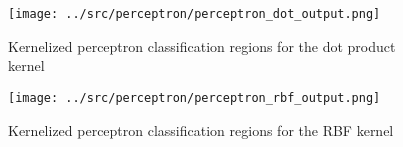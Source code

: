 \begin{answer}
\begin{figure}[h]
    \centering
    \texttt{[image: ../src/perceptron/perceptron\_dot\_output.png]}
    \caption{Kernelized perceptron classification regions for the dot product kernel}
\end{figure}

\begin{figure}[h]
    \centering
    \texttt{[image: ../src/perceptron/perceptron\_rbf\_output.png]}
    \caption{Kernelized perceptron classification regions for the RBF kernel}
\end{figure}
\end{answer}

\FloatBarrier